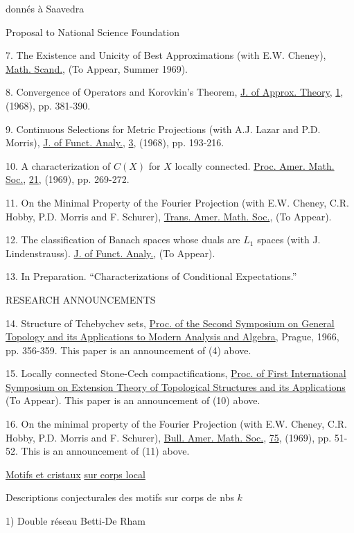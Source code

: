  donnés à Saavedra


Proposal to National Science Foundation

7. The Existence and Unicity of Best Approximations (with E.W. Cheney), \uline{Math. Scand.}, (To Appear, Summer 1969).

8. Convergence of Operators and Korovkin's Theorem, \uline{J. of Approx. Theory}, \uline{1}, (1968), pp. 381-390.

9. Continuous Selections for Metric Projections (with A.J. Lazar and P.D. Morris), \uline{J. of Funct. Analy.}, \uline{3}, (1968), pp. 193-216.

10. A characterization of $C(X)$ for $X$ locally connected. \uline{Proc. Amer. Math. Soc.}, \uline{21}, (1969), pp. 269-272.

11. On the Minimal Property of the Fourier Projection (with E.W. Cheney, C.R. Hobby, P.D. Morris and F. Schurer), \uline{Trans. Amer. Math. Soc.}, (To Appear).

12. The classification of Banach spaces whose duals are $L_{1}$ spaces (with J. Lindenstrauss). \uline{J. of Funct. Analy.}, (To Appear).

13. In Preparation. ``Characterizations of Conditional Expectations.''

RESEARCH ANNOUNCEMENTS

14. Structure of Tchebychev sets, \uline{Proc. of the Second Symposium on General Topology and its Applications to Modern Analysis and Algebra}, Prague, 1966, pp. 356-359. This paper is an announcement of (4) above.

15. Locally connected Stone-Cech compactifications, \uline{Proc. of First International Symposium on Extension Theory of Topological Structures and its Applications} (To Appear). This paper is an announcement of (10) above.

16. On the minimal property of the Fourier Projection (with E.W. Cheney, C.R. Hobby, P.D. Morris and F. Schurer), \uline{Bull. Amer. Math. Soc.}, \uline{75}, (1969), pp. 51-52. This is an announcement of (11) above.

\uline{Motifs et cristaux} \uline{sur corps local}

Descriptions conjecturales des motifs sur corps de nbs  $k$

1) Double réseau Betti-De Rham

